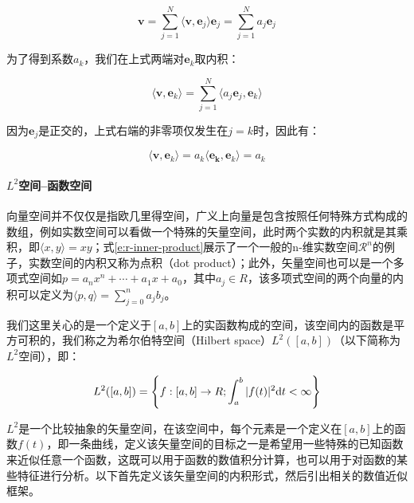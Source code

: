 \begin{equation}\label{e:r-basis-expand}
	\mathbf{v}=\sum^{N}_{j=1}\langle\mathbf{v},\mathbf{e}_j\rangle\mathbf{e}_j=\sum^{N}_{j=1}a_j\mathbf{e}_j
\end{equation}

\noindent 为了得到系数$a_k$，我们在上式两端对$\mathbf{e}_k$取内积：

\begin{equation}
	\langle\mathbf{v},\mathbf{e}_k\rangle=\sum^{N}_{j=1}\langle a_j\mathbf{e}_j,\mathbf{e}_k\rangle
\end{equation}

\noindent 因为$\mathbf{e}_j$是正交的，上式右端的非零项仅发生在$j=k$时，因此有：

\begin{equation}\label{e:r-coefficients}
	\langle\mathbf{v},\mathbf{e}_k\rangle=a_k\langle\mathbf{e_k},\mathbf{e}_k\rangle=a_k
\end{equation}




\paragraph{$L^{2}$空间--函数空间}
向量空间并不仅仅是指欧几里得空间，广义上向量是包含按照任何特殊方式构成的数组，例如实数空间可以看做一个特殊的矢量空间，此时两个实数的内积就是其乘积，即$\langle x,y\rangle=xy$；式\ref{e:r-inner-product}展示了一个一般的n-维实数空间$\mathcal{R}^{n}$的例子，实数空间的内积又称为点积（dot product）；此外，矢量空间也可以是一个多项式空间如$p=a_nx^{n}+\cdots +a_1x+a_0$，其中$a_j\in R$，该多项式空间的两个向量的内积可以定义为$\langle p,q\rangle=\sum^{n}_{j=0}a_jb_j$。

我们这里关心的是一个定义于$[a,b]$上的实函数构成的空间，该空间内的函数是平方可积的，我们称之为希尔伯特空间（Hilbert space）$L^{2}([a,b])$（以下简称为$L^{2}$空间），即：

\begin{equation}
	L^{2}([a,b])=\Biggl\{ f:[a,b]\to R;\int^{b}_a|f(t)|^{2}{\rm d}t<\infty\Biggl\}
\end{equation}

\noindent $L^{2}$是一个比较抽象的矢量空间，在该空间中，每个元素是一个定义在$[a,b]$上的函数$f(t)$，即一条曲线，定义该矢量空间的目标之一是希望用一些特殊的已知函数来近似任意一个函数，这既可以用于函数的数值积分计算，也可以用于对函数的某些特征进行分析。以下首先定义该矢量空间的内积形式，然后引出相关的数值近似框架。

